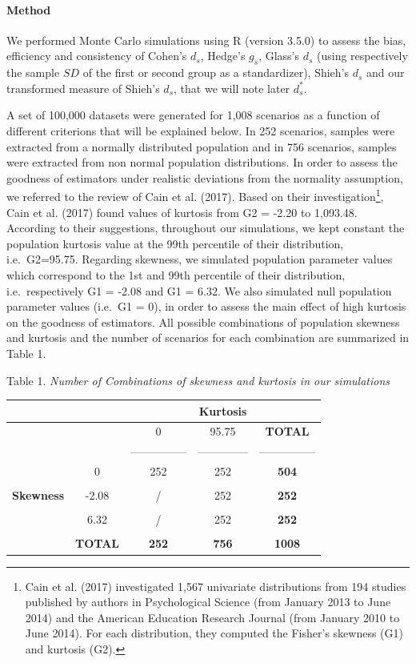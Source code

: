 \documentclass[
  man,floatsintext]{apa6}
\begin{document}
\hypertarget{method}{%
\paragraph{Method}\label{method}}

We performed Monte Carlo simulations using R (version 3.5.0) to assess the bias, efficiency and consistency of Cohen's \(d_s\), Hedge's \(g_s\), Glass's \(d_s\) (using respectively the sample \(SD\) of the first or second group as a standardizer), Shieh's \(d_s\) and our transformed measure of Shieh's \(d_s\), that we will note later \(d_s^*\).

A set of 100,000 datasets were generated for 1,008 scenarios as a function of different criterions that will be explained below. In 252 scenarios, samples were extracted from a normally distributed population and in 756 scenarios, samples were extracted from non normal population distributions. In order to assess the goodness of estimators under realistic deviations from the normality assumption, we referred to the review of Cain et al. (2017). Based on their investigation\footnote{Cain et al. (2017) investigated 1,567 univariate distributions from 194 studies published by authors in Psychological Science (from January 2013 to June 2014) and the American Education Research Journal (from January 2010 to June 2014). For each distribution, they computed the Fisher's skewness (G1) and kurtosis (G2). }, Cain et al. (2017) found values of kurtosis from G2 = -2.20 to 1,093.48. According to their suggestions, throughout our simulations, we kept constant the population kurtosis value at the 99th percentile of their distribution, i.e.~G2=95.75. Regarding skewness, we simulated population parameter values which correspond to the 1st and 99th percentile of their distribution, i.e.~respectively G1 = -2.08 and G1 = 6.32. We also simulated null population parameter values (i.e.~G1 = 0), in order to assess the main effect of high kurtosis on the goodness of estimators. All possible combinations of population skewness and kurtosis and the number of scenarios for each combination are summarized in Table 1.

Table 1.
\emph{Number of Combinations of skewness and kurtosis in our simulations}

\begin{longtable}[]{@{}ccccc@{}}
\toprule
& & & \textbf{Kurtosis} &\tabularnewline
\midrule
\endhead
& & 0 & 95.75 & \textbf{TOTAL}\tabularnewline
& & --------------- & -------------- & ---------------\tabularnewline
& 0 & 252 & 252 & \textbf{504}\tabularnewline
& & & &\tabularnewline
\textbf{Skewness} & -2.08 & / & 252 & \textbf{252}\tabularnewline
& & & &\tabularnewline
& 6.32 & / & 252 & \textbf{252}\tabularnewline
& & & &\tabularnewline
& \textbf{TOTAL} & \textbf{252} & \textbf{756} & \textbf{1008}\tabularnewline
\bottomrule
\end{longtable}
\end{document}
